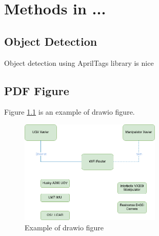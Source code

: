 \chapter{Methods in ...}

\section{Object Detection}
Object detection using AprilTags library is nice








\section{PDF Figure}
Figure \ref{fig:example_drawio} is an example of drawio figure.

\begin{figure}[H]
  \centering
  \includegraphics[width = 0.6\textwidth]{Figures/example_figure.drawio.png}
  \caption{Example of drawio figure}
  \label{fig:example_drawio}
\end{figure}
